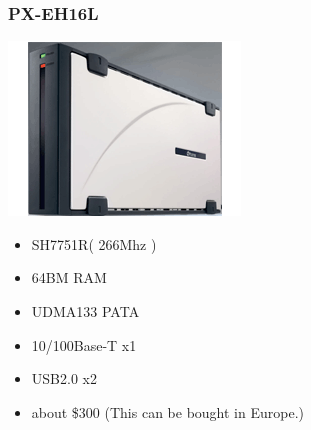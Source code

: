 \documentclass[cjk,dvipdfmx,12pt]{beamer}
\begin{document}
\begin{frame}
 \frametitle{PX-EH16L}
 \begin{minipage}[t]{0.4\hsize}
  \includegraphics[width=1.0\hsize]{image200705/PX-EH16L.png}
 \end{minipage} 
 \begin{minipage}[t]{0.5\hsize}
  \begin{itemize}
   \item SH7751R( 266Mhz )
   \item 64BM RAM
   \item UDMA133 PATA 
   \item 10/100Base-T x1
   \item USB2.0 x2 
   \item about \$300 (This can be bought in Europe.)
  \end{itemize}
 \end{minipage}
\end{frame}


\end{document}
